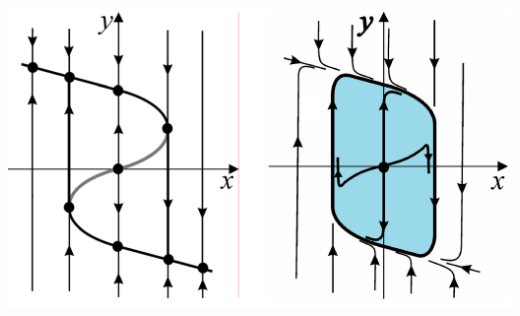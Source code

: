 \begin{multicols*}{2}
		\includegraphics[width=0.5\linewidth]{tk_practice_img/sbmd}
		


	\end{multicols*}
